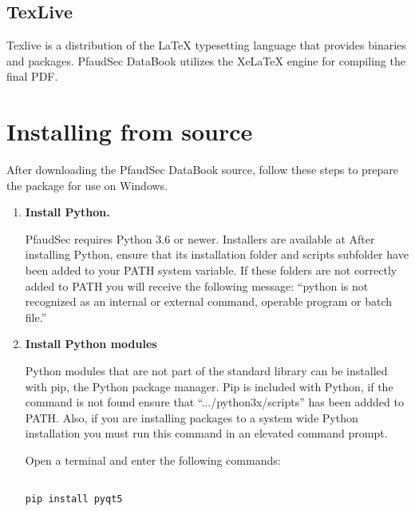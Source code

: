 \documentclass[14pt]{article}
\newcommand{\chref}[3][black]{\href{#2}{\color{#1}{#3}}}%
\begin{document}
\begin{flushleft}
	\subsection{TexLive}
Texlive is a distribution of the \LaTeX\xspace typesetting language that provides binaries and packages.
PfaudSec DataBook utilizes the XeLaTeX engine for compiling the final PDF.

\section{Installing from source}
\label{sec:install}

After downloading the PfaudSec DataBook source, follow these steps to prepare the package for use on Windows.

\begin{enumerate}

\item \textbf{Install Python.}

PfaudSec requires Python 3.6 or newer.
Installers are available at
\chref[pfblue]{https://www.python.org/downloads/}{https://www.python.org/downloads/}
After installing Python, ensure that its installation folder and scripts subfolder have been added to your PATH system variable.
If these folders are not correctly added to PATH you will receive the following message: 
``python is not recognized as an internal or external command, operable program or batch file.''

\item \textbf{Install Python modules}

Python modules that are not part of the standard library can be installed with pip, the Python package manager.
Pip is included with Python, if the command is not found ensure that ``.../python3x/scripts'' has been addded to PATH.
Also, if you are installing packages to a system wide Python installation you must run this command in an elevated command prompt.

Open a terminal and enter the following commands:

\begin{tcolorbox}[boxrule=0.5pt, colback=backgrey, colframe=bordergrey, sharpish corners] 
\begin{verbatim}

pip install pyqt5

\end{verbatim}
\end{tcolorbox}

\begin{tcolorbox}[boxrule=0.5pt, colback=backgrey, colframe=bordergrey, sharpish corners] 
\begin{verbatim}


\end{verbatim}
\end{tcolorbox}
\end{enumerate}
\end{flushleft}
\end{document}
